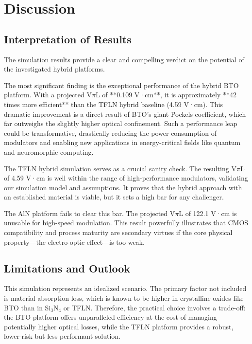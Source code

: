 \documentclass[12pt, a4paper, numbers]{report}
\begin{document}
\chapter{Discussion}
\section{Interpretation of Results}
The simulation results provide a clear and compelling verdict on the potential of the investigated hybrid platforms.

The most significant finding is the exceptional performance of the hybrid BTO platform. With a projected V$\pi$L of **0.109 V·cm**, it is approximately **42 times more efficient** than the TFLN hybrid baseline (4.59 V·cm). This dramatic improvement is a direct result of BTO's giant Pockels coefficient, which far outweighs the slightly higher optical confinement. Such a performance leap could be transformative, drastically reducing the power consumption of modulators and enabling new applications in energy-critical fields like quantum and neuromorphic computing.

The TFLN hybrid simulation serves as a crucial sanity check. The resulting V$\pi$L of 4.59 V·cm is well within the range of high-performance modulators, validating our simulation model and assumptions. It proves that the hybrid approach with an established material is viable, but it sets a high bar for any challenger.

The AlN platform fails to clear this bar. The projected V$\pi$L of 122.1 V·cm is unusable for high-speed modulation. This result powerfully illustrates that CMOS compatibility and process maturity are secondary virtues if the core physical property—the electro-optic effect—is too weak.

\section{Limitations and Outlook}
This simulation represents an idealized scenario. The primary factor not included is material absorption loss, which is known to be higher in crystalline oxides like BTO than in Si$_3$N$_4$ or TFLN. Therefore, the practical choice involves a trade-off: the BTO platform offers unparalleled efficiency at the cost of managing potentially higher optical losses, while the TFLN platform provides a robust, lower-risk but less performant solution.
\end{document}
